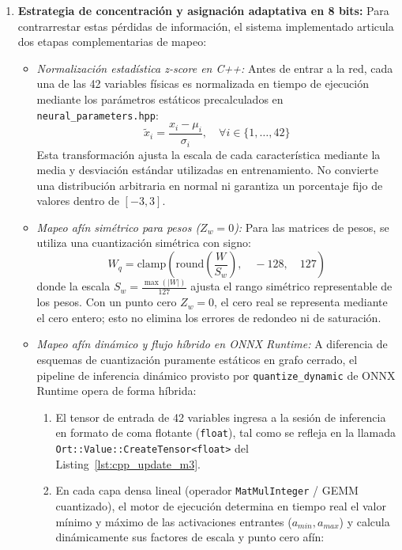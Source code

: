 \documentclass[12pt]{article}
\begin{document}
\begin{enumerate}
    \item \textbf{Estrategia de concentración y asignación adaptativa en 8 bits:}
    Para contrarrestar estas pérdidas de información, el sistema implementado articula dos etapas complementarias de mapeo:
    \begin{itemize}
        \item \textit{Normalización estadística z-score en C++:} Antes de entrar a la red, cada una de las 42 variables físicas es normalizada en tiempo de ejecución mediante los parámetros estáticos precalculados en \texttt{neural\_parameters.hpp}:
        \begin{equation}
            \tilde{x}_i = \frac{x_i - \mu_i}{\sigma_i}, \quad \forall i \in \{1, \dots, 42\}
        \end{equation}
        Esta transformación ajusta la escala de cada característica mediante la media y desviación estándar utilizadas en entrenamiento. No convierte una distribución arbitraria en normal ni garantiza un porcentaje fijo de valores dentro de $[-3,3]$.
        \item \textit{Mapeo afín simétrico para pesos ($Z_w = 0$):} Para las matrices de pesos, se utiliza una cuantización simétrica con signo:
        \begin{equation}
            W_q = \text{clamp}\left( \text{round}\left( \frac{W}{S_w} \right), \quad -128, \quad 127 \right)
        \end{equation}
        donde la escala $S_w = \frac{\max(|W|)}{127}$ ajusta el rango simétrico representable de los pesos. Con un punto cero $Z_w=0$, el cero real se representa mediante el cero entero; esto no elimina los errores de redondeo ni de saturación.
        \item \textit{Mapeo afín dinámico y flujo híbrido en ONNX Runtime:} A diferencia de esquemas de cuantización puramente estáticos en grafo cerrado, el pipeline de inferencia dinámico provisto por \texttt{quantize\_dynamic} de ONNX Runtime opera de forma híbrida:
        \begin{enumerate}
            \item El tensor de entrada de 42 variables ingresa a la sesión de inferencia en formato de coma flotante (\texttt{float}), tal como se refleja en la llamada \texttt{Ort::Value::CreateTensor<float>} del Listing~\ref{lst:cpp_update_m3}.
            \item En cada capa densa lineal (operador \texttt{MatMulInteger} / GEMM cuantizado), el motor de ejecución determina en tiempo real el valor mínimo y máximo de las activaciones entrantes ($a_{min}, a_{max}$) y calcula dinámicamente sus factores de escala y punto cero afín:

\end{enumerate}
\end{itemize}
\end{enumerate}
\end{document}

